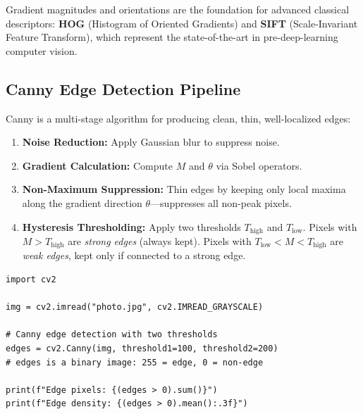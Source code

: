 \begin{remark}
Gradient magnitudes and orientations are the foundation for advanced classical descriptors: \textbf{HOG} (Histogram of Oriented Gradients) and \textbf{SIFT} (Scale-Invariant Feature Transform), which represent the state-of-the-art in pre-deep-learning computer vision.
\end{remark}

\subsection*{Canny Edge Detection Pipeline}
Canny is a multi-stage algorithm for producing clean, thin, well-localized edges:
\begin{enumerate}
    \item \textbf{Noise Reduction:} Apply Gaussian blur to suppress noise.
    \item \textbf{Gradient Calculation:} Compute $M$ and $\theta$ via Sobel operators.
    \item \textbf{Non-Maximum Suppression:} Thin edges by keeping only local maxima along the gradient direction $\theta$---suppresses all non-peak pixels.
    \item \textbf{Hysteresis Thresholding:} Apply two thresholds $T_{\text{high}}$ and $T_{\text{low}}$. Pixels with $M > T_{\text{high}}$ are \textit{strong edges} (always kept). Pixels with $T_{\text{low}} < M < T_{\text{high}}$ are \textit{weak edges}, kept only if connected to a strong edge.
\end{enumerate}

\begin{lstlisting}[style=pythonstyle]
import cv2

img = cv2.imread("photo.jpg", cv2.IMREAD_GRAYSCALE)

# Canny edge detection with two thresholds
edges = cv2.Canny(img, threshold1=100, threshold2=200)
# edges is a binary image: 255 = edge, 0 = non-edge

print(f"Edge pixels: {(edges > 0).sum()}")
print(f"Edge density: {(edges > 0).mean():.3f}")
\end{lstlisting}
